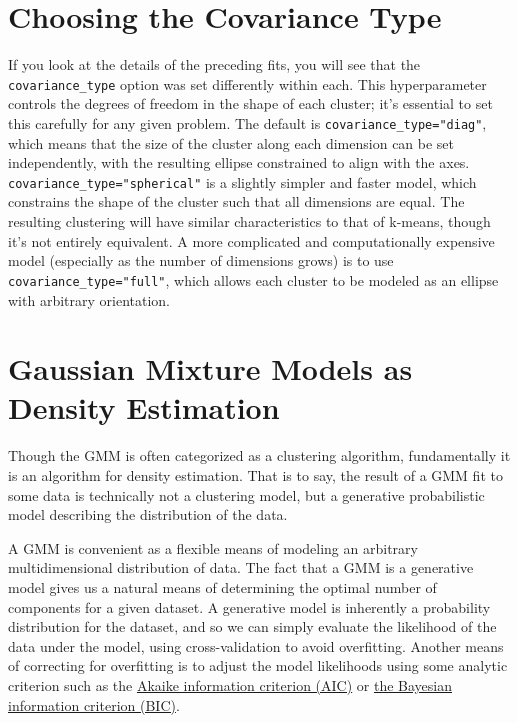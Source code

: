 \section{Choosing the Covariance Type}
If you look at the details of the preceding fits, you will see that the \verb|covariance_type| option was set differently within each. This hyperparameter controls the degrees of freedom in the shape of each cluster; it's essential to set this carefully for any given problem. The default is \verb|covariance_type="diag"|, which means that the size of the cluster along each dimension can be set independently, with the resulting ellipse constrained to align with the axes. \verb|covariance_type="spherical"| is a slightly simpler and faster model, which constrains the shape of the cluster such that all dimensions
are equal. The resulting clustering will have similar characteristics to that of k-means,
though it's not entirely equivalent. A more complicated and computationally expensive model (especially as the number of dimensions grows) is to use \verb|covariance_type="full"|, which allows each cluster to be modeled as an ellipse with arbitrary orientation.

\section{Gaussian Mixture Models as Density Estimation}
Though the GMM is often categorized as a clustering algorithm, fundamentally it is an algorithm for density estimation. That is to say, the result of a GMM fit to some data is technically not a clustering model, but a generative probabilistic model describing the distribution of the data.

A GMM is convenient as a flexible means of modeling an arbitrary multidimensional
distribution of data.
The fact that a GMM is a generative model gives us a natural means of determining
the optimal number of components for a given dataset. A generative model is inherently a probability distribution for the dataset, and so we can simply evaluate the likelihood of the data under the model, using cross-validation to avoid overfitting.
Another means of correcting for overfitting is to adjust the model likelihoods using
some analytic criterion such as the \href{https://en.wikipedia.org/wiki/Akaike_information_criterion}{Akaike information criterion (AIC)} or \href{https://en.wikipedia.org/wiki/Bayesian_information_criterion}{the Bayesian information criterion (BIC)}.